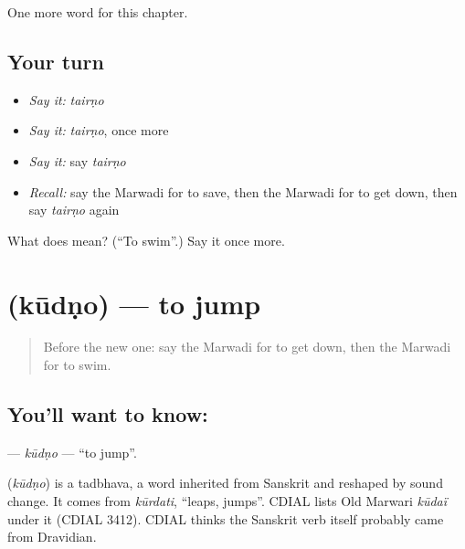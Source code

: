 \begin{grammarlens}[title={What you've built}]
One more word for this chapter.
\end{grammarlens}

\subsection*{Your turn}
\begin{itemize}
\raggedright
  \item \emph{Say it:} \emph{tairṇo}
  \item \emph{Say it:} \emph{tairṇo}, once more
  \item \emph{Say it:} say \emph{tairṇo}
  \item \emph{Recall:} say the Marwadi for to save, then the Marwadi for to get down, then say \emph{tairṇo} again
\end{itemize}

\begin{tcolorbox}[breakable,colback=teal!4,colframe=teal!35!black,title={Before you move on}]
What does  mean? (\textquotedblleft{}To swim\textquotedblright{}.) Say it once more.
\end{tcolorbox}
\section[\texorpdfstring{\mw{कूदणो} (kūdṇo)}{कूदणो (kūdṇo)}]{ (kūdṇo) — to jump}

\label{lesson:MW-C108-kudno}



\begin{quote}
Before the new one: say the Marwadi for to get down, then the Marwadi for to swim.
\end{quote}

\subsection*{You'll want to know: }
\textbf{} — \emph{kūdṇo} — \textquotedblleft{}to jump\textquotedblright{}.

\begin{cousinweb}
\textbf{} (\emph{kūdṇo}) is a tadbhava, a word inherited from Sanskrit and reshaped by sound change. It comes from \emph{kūrdati}, \textquotedblleft{}leaps, jumps\textquotedblright{}. CDIAL lists Old Marwari \emph{kūdaï} under it (CDIAL 3412). CDIAL thinks the Sanskrit verb itself probably came from Dravidian.
\end{cousinweb}

